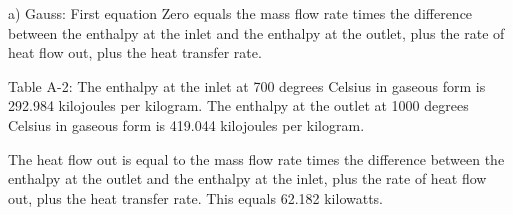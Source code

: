 a) Gauss: First equation
Zero equals the mass flow rate times the difference between the enthalpy at the inlet and the enthalpy at the outlet, plus the rate of heat flow out, plus the heat transfer rate.

Table A-2:
The enthalpy at the inlet at 700 degrees Celsius in gaseous form is 292.984 kilojoules per kilogram.
The enthalpy at the outlet at 1000 degrees Celsius in gaseous form is 419.044 kilojoules per kilogram.

The heat flow out is equal to the mass flow rate times the difference between the enthalpy at the outlet and the enthalpy at the inlet, plus the rate of heat flow out, plus the heat transfer rate.
This equals 62.182 kilowatts.